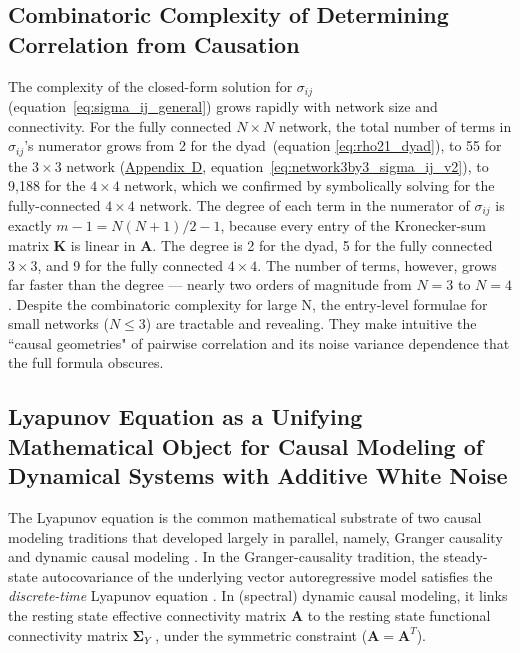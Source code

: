 \documentclass[12pt]{article}
\begin{document}
\subsection*{Combinatoric Complexity of Determining Correlation
             from Causation}
The complexity of the closed-form solution for $\sigma_{ij}$
(equation~\ref{eq:sigma_ij_general}) grows rapidly with network size and
connectivity. For the fully connected $ N \times N $ network, the total number of terms in
$\sigma_{ij}$'s numerator grows from 2 for the dyad~(equation \ref{eq:rho21_dyad}), to 55 for the $3\times3$ network
(\hyperref[app:appD]{Appendix~D}, equation~\ref{eq:network3by3_sigma_ij_v2}),
to 9{,}188 for the $4\times4$ network, which we confirmed by symbolically solving for the fully-connected $4\times4$ network. The degree of each term in the numerator of $\sigma_{ij}$ is exactly
$m-1=N(N+1)/2-1$, because every entry of the Kronecker-sum matrix
$\mathbf{K}$ is linear in $\mathbf{A}$. The degree is 2 for the dyad, 5 for the fully connected $3\times3$, and 9
for the fully connected $4\times4$. 
The number of terms, however, grows far faster than the degree ---
nearly two orders of magnitude from $N=3$ to $N=4$. Despite the combinatoric complexity for large N, the entry-level formulae for small networks ($N \le 3$) are tractable and revealing. They make intuitive the ``causal geometries" of pairwise correlation and its noise variance dependence that the full formula obscures. 

\subsection*{Lyapunov Equation as a Unifying Mathematical Object
             for Causal Modeling of Dynamical Systems with Additive
             White Noise}

The Lyapunov equation is the common mathematical substrate
of two causal modeling traditions that developed largely
in parallel, namely, Granger causality \citep{Granger1969, BarnettSeth2014} and dynamic causal modeling
\citep{FristonHarrisonPenny2003, DaunizeauStephanFriston2012}. In the Granger-causality tradition, the steady-state autocovariance of the
underlying vector autoregressive model satisfies the \emph{discrete-time}
 Lyapunov equation \citep{Stein1952}. In (spectral) dynamic causal modeling, it links the resting state effective
connectivity matrix $\mathbf{A}$ to the resting state functional connectivity matrix
$\mathbf{\Sigma}_Y$ \citep{Friston2014}, under the symmetric constraint ($\mathbf{A}=\mathbf{A}^T$).
\end{document}
